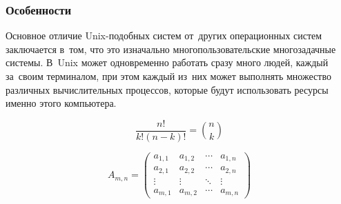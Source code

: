 \documentclass{bmstu}
\begin{document}
\subsubsection{Особенности}

Основное отличие Unix-подобных систем от~других операционных систем заключается в~том, что это изначально многопользовательские многозадачные системы.
В~Unix может одновременно работать сразу много людей, каждый за~своим терминалом, при этом каждый из~них может выполнять множество различных вычислительных процессов, которые будут использовать ресурсы именно этого компьютера. \newpage


\begin{equation}\label{equ:matrix}
	\frac{n!}{k!(n-k)!} = \binom{n}{k}
\end{equation}

\begin{equation*}
	A_{m,n} = 
	\begin{pmatrix}
		a_{1,1} & a_{1,2} & \cdots & a_{1,n} \\
		a_{2,1} & a_{2,2} & \cdots & a_{2,n} \\
		\vdots  & \vdots  & \ddots & \vdots  \\
		a_{m,1} & a_{m,2} & \cdots & a_{m,n} 
	\end{pmatrix}
\end{equation*}
\end{document}
